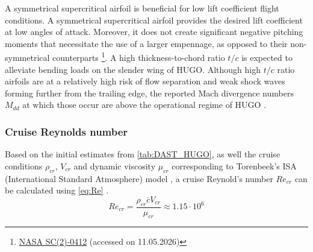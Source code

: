 A symmetrical supercritical airfoil is beneficial for low lift coefficient flight conditions.
A symmetrical supercritical airfoil provides the desired lift coefficient at low angles of attack. %
Moreover, it does not create significant negative pitching moments that necessitate the use of a larger empennage, as opposed to their non-symmetrical counterparts \footnote{\href{http://airfoiltools.com/polar/details?polar=xf-sc20412-il-1000000-n5}{NASA SC(2)-0412} (accessed on 11.05.2026)}. A high thickness-to-chord ratio $t/c$ is expected to alleviate bending loads on the slender wing of HUGO. Although high $t/c$ ratio airfoils are at a relatively high risk of flow separation and weak shock waves forming further from the trailing edge, the reported Mach divergence numbers $M_{dd}$ at which those occur are above the operational regime of HUGO \cite{Harris1990}.

\subsubsection*{Cruise Reynolds number}
Based on the initial estimates from \autoref{tab:DAST_HUGO}, as well the cruise conditions $\rho_{cr}$, $V_{cr}$ and dynamic viscosity $\mu_{cr}$ corresponding to Torenbeek's ISA (International Standard Atmosphere) model \cite{AdvancedACDesign_Torenbeek}, a cruise Reynold's number $Re_{cr}$ can be calculated using \autoref{eq:Re} \cite{torenbeek2013synthesis}.
\begin{equation}
    Re_{cr} = \frac{\rho_{cr} \overline{c}V_{cr}}{\mu_{cr}} \approx 1.15\cdot10^6
    \label{eq:Re}
\end{equation}

